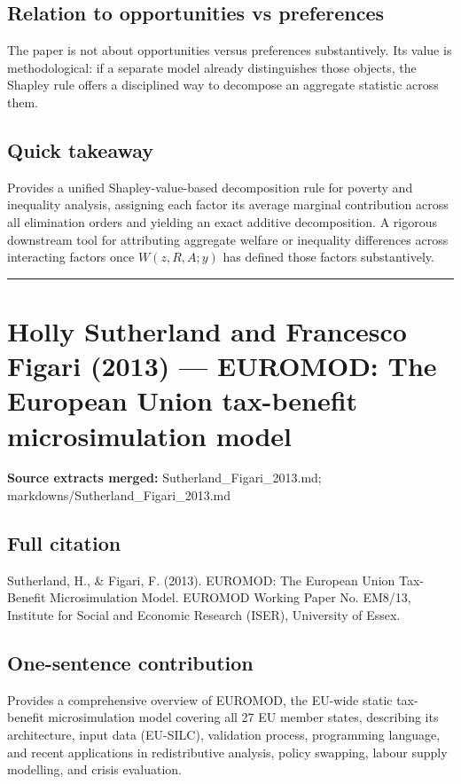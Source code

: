 \documentclass[11pt,a4paper]{article}
\begin{document}
\subsection*{Relation to opportunities vs preferences}
The paper is not about opportunities versus preferences substantively. Its value is methodological: if a separate model already distinguishes those objects, the Shapley rule offers a disciplined way to decompose an aggregate statistic across them.

\subsection*{Quick takeaway}
Provides a unified Shapley-value-based decomposition rule for poverty and inequality analysis, assigning each factor its average marginal contribution across all elimination orders and yielding an exact additive decomposition. A rigorous downstream tool for attributing aggregate welfare or inequality differences across interacting factors once $W(z,R,A;y)$ has defined those factors substantively.

\medskip\hrule\medskip

\section*{Holly Sutherland and Francesco Figari (2013) — EUROMOD: The European Union tax-benefit microsimulation model}

\textbf{Source extracts merged:} Sutherland\_Figari\_2013.md; markdowns/Sutherland\_Figari\_2013.md

\subsection*{Full citation}
Sutherland, H., \& Figari, F. (2013). EUROMOD: The European Union Tax-Benefit Microsimulation Model. EUROMOD Working Paper No. EM8/13, Institute for Social and Economic Research (ISER), University of Essex.

\subsection*{One-sentence contribution}
Provides a comprehensive overview of EUROMOD, the EU-wide static tax-benefit microsimulation model covering all 27 EU member states, describing its architecture, input data (EU-SILC), validation process, programming language, and recent applications in redistributive analysis, policy swapping, labour supply modelling, and crisis evaluation.
\end{document}
